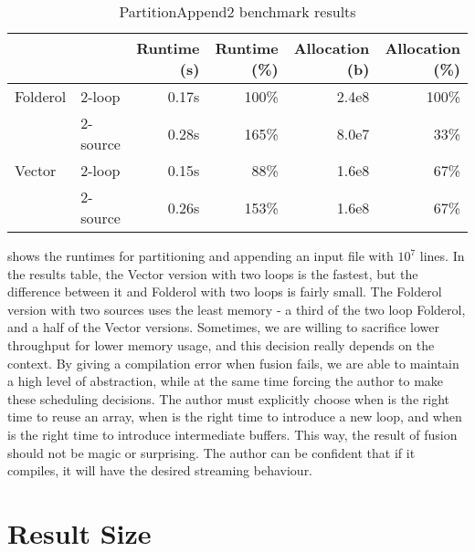 \begin{table}
\begin{center}
\begin{tabular}{ll|rrrr}
& & Runtime (s)  & Runtime (\%) & Allocation (b) & Allocation (\%) \\
\hline
Folderol & 2-loop   & 0.17s &   100\% & 2.4e8 & 100\% \\
         & 2-source & 0.28s &   165\% & 8.0e7 &  33\% \\
Vector   & 2-loop   & 0.15s &    88\% & 1.6e8 &  67\% \\
         & 2-source & 0.26s &   153\% & 1.6e8 &  67\% \\
\end{tabular}
\end{center}
\caption[PartitionAppend2 benchmark results]{PartitionAppend2 benchmark results}
\label{table:bench:part2app2}
\end{table}

 shows the runtimes for partitioning and appending an input file with $10^7$ lines.
In the results table, the Vector version with two loops is the fastest, but the difference between it and Folderol with two loops is fairly small.
The Folderol version with two sources uses the least memory - a third of the two loop Folderol, and a half of the Vector versions.
Sometimes, we are willing to sacrifice lower throughput for lower memory usage, and this decision really depends on the context.
By giving a compilation error when fusion fails, we are able to maintain a high level of abstraction, while at the same time forcing the author to make these scheduling decisions.
The author must explicitly choose when is the right time to reuse an array, when is the right time to introduce a new loop, and when is the right time to introduce intermediate buffers.
This way, the result of fusion should not be magic or surprising.
The author can be confident that if it compiles, it will have the desired streaming behaviour.

\section{Result Size}

